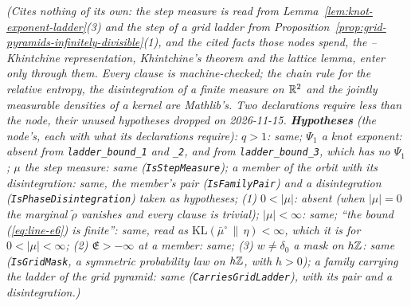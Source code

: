 \begin{proposition}
\begin{enumerate}
\end{enumerate}
\statusT\quad\emph{(Cites nothing of its own: the step measure is read from
Lemma~\ref{lem:knot-exponent-ladder}(3) and the step of a grid ladder from
Proposition~\ref{prop:grid-pyramids-infinitely-divisible}(1), and the cited facts those nodes
spend, the \Levy{}--Khintchine representation, Khintchine's theorem and the lattice lemma, enter
only through them. Every clause is machine-checked; the chain rule for the relative entropy, the
disintegration of a finite measure on $\mathbb{R}^2$ and the jointly measurable densities of a kernel are
Mathlib's. Two declarations require less than the node, their unused hypotheses dropped on 2026-11-15.
\textbf{Hypotheses} (the node's, each with what its declarations require): $q > 1$: same; $\Psi_1$ a
knot exponent: absent from \texttt{ladder\_bound\_1} and \texttt{\_2}, and from
\texttt{ladder\_bound\_3}, which has no $\Psi_1$; $\mu$ the step measure: same
(\texttt{IsStepMeasure}); a member of the orbit with its disintegration: same, the member's pair
(\texttt{IsFamilyPair}) and a disintegration (\texttt{IsPhaseDisintegration}) taken as hypotheses;
(1) $0 < |\mu|$: absent (when $|\mu| = 0$ the marginal $\tilde\rho$ vanishes and every clause is
trivial); $|\mu| < \infty$: same; ``the bound (\ref{eq:line-e6}) is finite'': same, read as
$\mathrm{KL}(\bar\mu^\circ \,\|\, \eta) < \infty$, which it is for $0 < |\mu| < \infty$; (2)
$\mathfrak{E} > -\infty$ at a member: same; (3) $w \ne \delta_0$ a mask on $h\mathbb{Z}$: same
(\texttt{IsGridMask}, a symmetric probability law on $h\mathbb{Z}$, with $h > 0$); a family carrying the
ladder of the grid pyramid: same (\texttt{CarriesGridLadder}), with its pair and a
disintegration.)}
\end{proposition}

